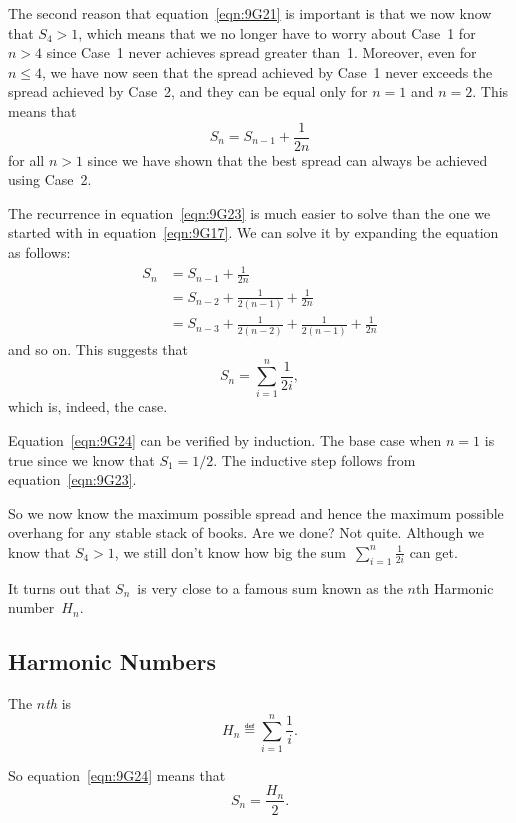 The second reason that equation~\ref{eqn:9G21} is important is that we
now know that $S_4 > 1$, which means that we no longer have to worry
about Case~1 for $n > 4$ since Case~1 never achieves spread greater
than~1.  Moreover, even for~$n \le 4$, we have now seen that the
spread achieved by Case~1 never exceeds the spread achieved by Case~2,
and they can be equal only for $n = 1$ and $n = 2$.  This means that
\begin{equation}\label{eqn:9G23}
    S_n = S_{n - 1} + \frac{1}{2n}
\end{equation}
for all $n > 1$ since we have shown that the best spread can always be
achieved using Case~2.

The recurrence in equation~\ref{eqn:9G23} is much easier to solve than
the one we started with in equation~\ref{eqn:9G17}.  We can solve it
by expanding the equation as follows:
\begin{align*}
S_n &= S_{n - 1} + \frac{1}{2n} \\
    &= S_{n - 2} + \frac{1}{2(n - 1)} + \frac{1}{2n} \\
    &= S_{n - 3} + \frac{1}{2(n - 2)} + \frac{1}{2(n - 1)} + \frac{1}{2n}
\end{align*}
and so on.  This suggests that
\begin{equation}\label{eqn:9G24}
    S_n = \sum_{i = 1}^n \frac{1}{2i},
\end{equation}
which is, indeed, the case.

Equation~\ref{eqn:9G24} can be verified by induction.  The base case
when $n = 1$ is true since we know that $S_1 = 1/2$.  The inductive
step follows from equation~\ref{eqn:9G23}.

So we now know the maximum possible spread and hence the maximum
possible overhang for any stable stack of books.  Are we done?  Not
quite.  Although we know that $S_4 > 1$, we still don't know how big
the sum~$\sum_{i = 1}^n \frac{1}{2i}$ can get.

It turns out that $S_n$~is very close to a famous sum known as the
$n$th Harmonic number~$H_n$.

\subsection{Harmonic Numbers}

\begin{definition}
The \emph{$n$th}  is
\[
    H_n \eqdef \sum_{i=1}^n \frac{1}{i}.
\]
\end{definition}
So equation~\ref{eqn:9G24} means that
\begin{equation}\label{eqn:9G25}
    S_n = \frac{H_n}{2}.
\end{equation}

